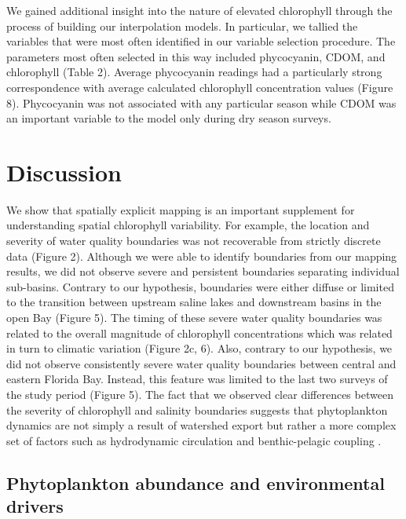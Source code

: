 We gained additional insight into the nature of elevated chlorophyll through the process of building our interpolation models. In particular, we tallied the variables that were most often identified in our variable selection procedure. The parameters most often selected in this way included phycocyanin, CDOM, and chlorophyll (Table 2). Average phycocyanin readings had a particularly strong correspondence with average calculated chlorophyll concentration values (Figure 8). Phycocyanin was not associated with any particular season while CDOM was an important variable to the model only during dry season surveys.

\section{Discussion}
\label{discussion}

We show that spatially explicit mapping is an important supplement for understanding spatial chlorophyll variability. For example, the location and severity of water quality boundaries was not recoverable from strictly discrete data (Figure 2). Although we were able to identify boundaries from our mapping results, we did not observe severe and persistent boundaries separating individual sub-basins. Contrary to our hypothesis, boundaries were either diffuse or limited to the transition between upstream saline lakes and downstream basins in the open Bay (Figure 5). The timing of these severe water quality boundaries was related to the overall magnitude of chlorophyll concentrations which was related in turn to climatic variation (Figure 2c, 6). Also, contrary to our hypothesis, we did not observe consistently severe water quality boundaries between central and eastern Florida Bay. Instead, this feature was limited to the last two surveys of the study period (Figure 5). The fact that we observed clear differences between the severity of chlorophyll and salinity boundaries suggests that phytoplankton dynamics are not simply a result of watershed export but rather a more complex set of factors such as hydrodynamic circulation and benthic-pelagic coupling \citep[Figure 6, ][]{zhang_2014, lawrence2004wind}. 

\subsection{Phytoplankton abundance and environmental drivers}
\label{phytoabund}

